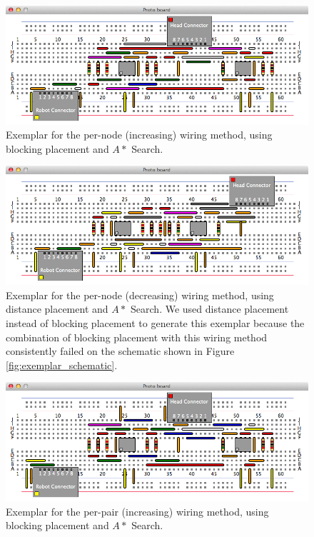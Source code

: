\begin{figure}[H]
\begin{center}
\includegraphics[width=\textwidth]{Images/exemplar_per_node_increasing.png}
\caption[Per-node (increasing) method exemplar]{Exemplar for the per-node
(increasing) wiring method, using blocking placement and $A*$ Search.}
\end{center}
\end{figure}

\begin{figure}[H]
\begin{center}
\includegraphics[width=\textwidth]{Images/exemplar_per_node_decreasing.png}
\caption[Per-node (decreasing) method exemplar]{Exemplar for the per-node
(decreasing) wiring method, using distance placement and $A*$ Search. We used
distance placement instead of blocking placement to generate this
exemplar because the combination of blocking placement with this wiring
method consistently failed on the schematic shown in Figure
\ref{fig:exemplar_schematic}.}
\end{center}
\end{figure}

\begin{figure}[H]
\begin{center}
\includegraphics[width=\textwidth]{Images/exemplar_per_pair_increasing.png}
\caption[Per-pair (increasing) method exemplar]{Exemplar for the per-pair
(increasing) wiring method, using blocking placement and $A*$ Search.}
\end{center}
\end{figure}

